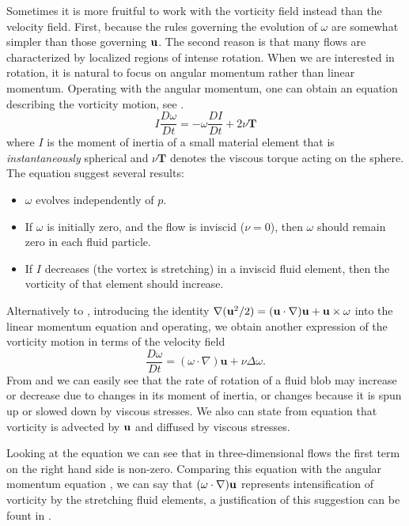 Sometimes it is more fruitful to work with the vorticity field instead than the velocity field. First, because the rules governing the evolution of $\omega$ are somewhat simpler than those governing ${\bf u}$. The second reason is that many flows are characterized by localized regions of intense rotation. When we are interested in rotation, it is natural to focus on angular momentum rather than linear momentum. Operating with the angular momentum, one can obtain an equation describing the vorticity motion, see \cite{davidson_turbulence:_2004}.
\begin{equation}
\label{eq-vorticity}
I\frac{D\omega}{Dt}=-\omega\frac{DI}{Dt}+2\nu\mathbf{T}
\end{equation}
where $I$ is the moment of inertia of a small material element that is \textit{instantaneously} spherical and $\nu\mathbf{T}$ denotes the viscous torque acting on the sphere. The equation  suggest several results:
\begin{itemize}
\item $\omega$ evolves independently of $ p $.
\item If $\omega$ is initially zero, and the flow is inviscid ($ \nu=0 $), then $\omega$ should remain zero in each fluid particle.
\item If $I$ decreases (the vortex is stretching) in a inviscid fluid element, then the vorticity of that element should increase.
\end{itemize}
Alternatively to , introducing the identity $\nabla({\bf u}^2/2)=({\bf u}\cdot\nabla){\bf u}+{\bf u}\times\omega$ into the linear momentum equation and operating, we obtain another expression of the vorticity motion in terms of the velocity field
\begin{equation}
\label{eq-vorticity_velocity}
\frac{D\omega}{Dt}=(\omega\cdot\nabla)\mathbf{u}+\nu\Delta\omega.
\end{equation}
From  and  we can easily see that the rate of rotation of a fluid blob may increase or decrease due to changes in its moment of inertia, or changes because it is spun up or slowed down by viscous stresses. We also can state from equation  that vorticity is advected by ${\bf u}$ and diffused by viscous stresses.

Looking at the equation  we can see that in three-dimensional flows the first term on the right hand side is non-zero. Comparing this equation with the angular momentum equation , we can say that $(\omega\cdot\nabla){\bf u}$ represents intensification of vorticity by the stretching fluid elements, a justification of this suggestion can be fount in \cite{pope_turbulent_2000}.

